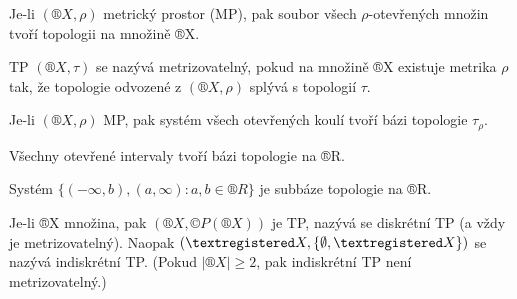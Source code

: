\documentclass[12pt]{article}					%
\begin{document}
    \begin{priklad}
        Je-li $(®X, \rho)$ metrický prostor (MP), pak soubor všech $\rho$-otevřených množin tvoří topologii na množině ®X.
    \end{priklad}

    \begin{definice}[Metrizovatelný TP]
        TP $(®X, \tau)$ se nazývá metrizovatelný, pokud na množině ®X existuje metrika $\rho$ tak, že topologie odvozené z $(®X, \rho)$ splývá s topologií $\tau$.
    \end{definice}

    \begin{priklad}
        Je-li $(®X, \rho)$ MP, pak systém všech otevřených koulí tvoří bázi topologie $\tau_\rho$.
        \begin{prikladyin}
            Všechny otevřené intervaly tvoří bázi topologie na ®R.
            
            Systém $\{(-\infty, b), (a, \infty): a,b \in ®R\}$ je subbáze topologie na ®R.
        \end{prikladyin}
    \end{priklad}

    \begin{priklad}
        Je-li ®X množina, pak $(®X, ©P(®X))$ je TP, nazývá se diskrétní TP (a vždy je metrizovatelný). Naopak $(®X, \{\O, ®X\})$ se nazývá indiskrétní TP. (Pokud $|®X| ≥ 2$, pak indiskrétní TP není metrizovatelný.)
    \end{priklad}
\end{document}
